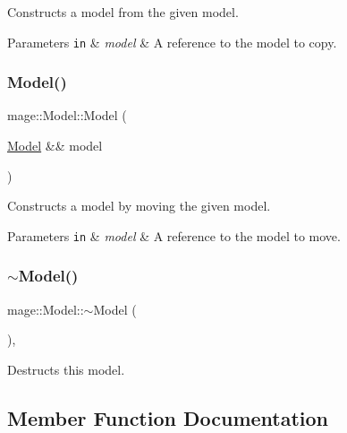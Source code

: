 Constructs a model from the given model.


\begin{DoxyParams}[1]{Parameters}
\mbox{\tt in}  & {\em model} & A reference to the model to copy. \\
\hline
\end{DoxyParams}
\hypertarget{classmage_1_1_model_a71abc57cde3bd6270de88bfa3aa47601}{}\label{classmage_1_1_model_a71abc57cde3bd6270de88bfa3aa47601} 
\subsubsection{\texorpdfstring{Model()}{Model()}\hspace{0.1cm}{\footnotesize\ttfamily [3/3]}}
{\footnotesize\ttfamily mage\+::\+Model\+::\+Model (\begin{DoxyParamCaption}\item[{\hyperlink{classmage_1_1_model}{Model} \&\&}]{model }\end{DoxyParamCaption})\hspace{0.3cm}{\ttfamily [default]}}

Constructs a model by moving the given model.


\begin{DoxyParams}[1]{Parameters}
\mbox{\tt in}  & {\em model} & A reference to the model to move. \\
\hline
\end{DoxyParams}
\hypertarget{classmage_1_1_model_af9f45ed2dcf470f85bbfd144ca9857a7}{}\label{classmage_1_1_model_af9f45ed2dcf470f85bbfd144ca9857a7} 
\subsubsection{\texorpdfstring{$\sim$\+Model()}{~Model()}}
{\footnotesize\ttfamily mage\+::\+Model\+::$\sim$\+Model (\begin{DoxyParamCaption}{ }\end{DoxyParamCaption})\hspace{0.3cm}{\ttfamily [virtual]}, {\ttfamily [default]}}

Destructs this model. 

\subsection{Member Function Documentation}
\hypertarget{classmage_1_1_model_a39d5f0b2b83729a68569072d69113ed7}{}\label{classmage_1_1_model_a39d5f0b2b83729a68569072d69113ed7} 
